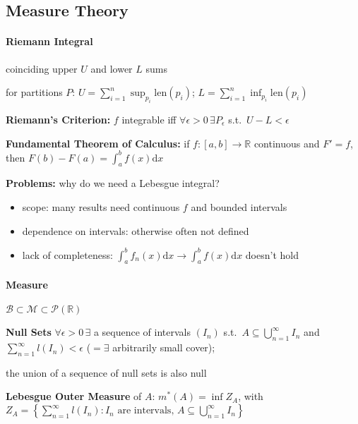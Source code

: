 \documentclass[8pt,twoside]{extarticle}
\begin{document}

\subsection[Measure Theory]{Measure Theory \citep{capinski_measure_2004}}

\begin{multicols}{2}


\paragraph{Riemann Integral} coinciding upper $U$ and lower $L$ sums

for partitions $P$: $U=\sum_{i=1}^n \sup_{p_i} \mathrm{len}(p_i)$; $L=\sum_{i=1}^n \inf_{p_i} \mathrm{len}(p_i)$

\textbf{Riemann's Criterion:} $f$ integrable iff $\forall \epsilon> 0 \,\exists P_\epsilon$ s.t.\ $U{-}L <\epsilon$

\textbf{Fundamental Theorem of Calculus:} if $f:[a,b]\to \mathbb{R}$ continuous and $F'=f$, then $F(b)-F(a)=\int_a^bf(x)\mathrm{d} x$

\textbf{Problems:} why do we need a Lebesgue integral?
\begin{itemize}[itemsep=0em, topsep=0pt, partopsep=0pt,parsep=0pt, leftmargin=1.0em]
\item scope: many results need continuous $f$ and bounded intervals
\item dependence on intervals: otherwise often not defined
\item lack of completeness: $\int_a^b f_n(x) \mathrm{d}x \to \int_a^b f(x) \mathrm{d}x$ doesn't hold
\end{itemize} 

\paragraph{Measure} $\mathcal{B}\subset\mathcal{M}\subset\mathcal{P}(\mathbb{R})$

\textbf{Null Sets} $\forall \epsilon>0 \,\exists$ a sequence of intervals $(I_n)$ s.t.\ \newline $A\subseteq \bigcup_{n=1}^\infty I_n$ and $\sum_{n=1}^\infty l(I_n)<\epsilon$ ($=\exists$ arbitrarily small cover);

the union of a sequence of null sets is also null

\textbf{Lebesgue Outer Measure} of $A$: $m^*(A)=\inf Z_A$, with 
$Z_A = \left\{ \sum_{n=1}^\infty l(I_n): I_n \text{ are intervals, } A\subseteq \bigcup_{n=1}^\infty I_n \right\}$


\end{multicols}
\end{document}
